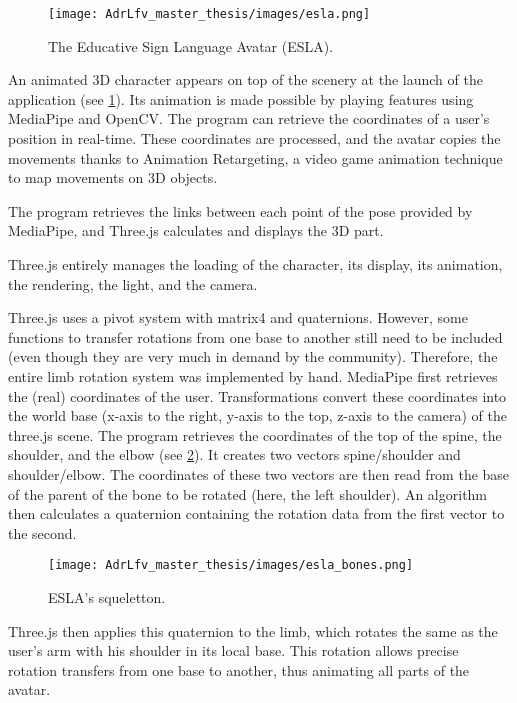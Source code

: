 \begin{figure}[h]
    \centering
    \texttt{[image: AdrLfv\_master\_thesis/images/esla.png]}
    \caption{The Educative Sign Language Avatar (ESLA).}
    \label{fig:esla}
\end{figure}


An animated 3D character appears on top of the scenery at the launch of the application (see \ref{fig:esla}). Its animation is made possible by playing features using MediaPipe and OpenCV. The program can retrieve the coordinates of a user's position in real-time. These coordinates are processed, and the avatar copies the movements thanks to Animation Retargeting, a video game animation technique to map movements on 3D objects.

The program retrieves the links between each point of the pose provided by MediaPipe, and Three.js calculates and displays the 3D part. 

Three.js entirely manages the loading of the character, its display, its animation, the rendering, the light, and the camera.

Three.js uses a pivot system with matrix4 and quaternions. However, some functions to transfer rotations from one base to
another still need to be included (even though they are very much in demand by the community). Therefore, the entire limb rotation system was implemented by hand.
MediaPipe first retrieves the (real) coordinates of the user. Transformations convert these coordinates into the world base (x-axis to the right, y-axis to the top, z-axis to the camera) of the three.js scene. The program retrieves the coordinates of the top of the spine, the shoulder, and the elbow (see \ref{fig:esla_bones}). It creates two vectors spine/shoulder and shoulder/elbow. The coordinates of these two vectors are then read from the base of the parent of the bone to be rotated (here, the left shoulder). An algorithm then calculates a quaternion containing the rotation data from the first vector to the second.

\begin{figure}[h]
    \centering
    \texttt{[image: AdrLfv\_master\_thesis/images/esla\_bones.png]}
    \caption{ESLA's squeletton.}
    \label{fig:esla_bones}
\end{figure}

Three.js then applies this quaternion to the limb, which rotates the same as the user's arm with his shoulder in its local base.
This rotation allows precise rotation transfers from one base to another, thus animating all parts of the avatar.

